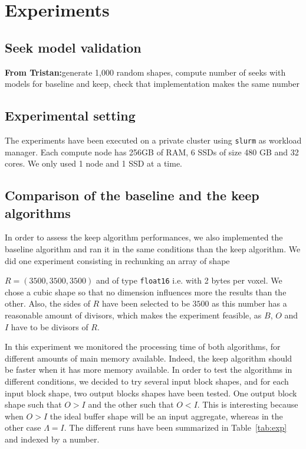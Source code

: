 \documentclass[sigconf, nonacm]{acmart}
\newcommand{\tristan}[1]{\color{orange}\textbf{From Tristan:}#1\color{black}}
\begin{document}
\section{Experiments}
\label{sec:experiments}
\subsection{Seek model validation}

\tristan{generate 1,000 random shapes, compute number of seeks with models for baseline and keep, 
check that implementation makes the same number}

\subsection{Experimental setting}
The experiments have been executed on a private
cluster using \texttt{slurm} as workload manager. Each compute node has 256GB of
RAM, 6 SSDs of size 480 GB and 32 cores. We only used 1 node and 1 SSD at a
time.

\subsection{Comparison of the baseline and the keep algorithms}
In order to assess the keep algorithm performances, we also implemented the
baseline algorithm and ran it in the same conditions than the keep algorithm.
We did one experiment consisting in rechunking an array of shape

$R=(3500,3500,3500)$ and of type \texttt{float16} i.e. with 2 bytes per voxel.
We chose a cubic shape so that no dimension influences more the results than
the other.
Also, the sides of $R$ have been selected to be $3500$ as this number has a
reasonable amount of divisors, which makes the experiment feasible, as
$B$, $O$ and $I$ have to be divisors of $R$.

In this experiment we monitored the processing time of both algorithms, for
different amounts of main memory available.
Indeed, the keep algorithm should be faster when it has more memory available.
In order to test the algorithms in different conditions, we decided to try
several input block shapes, and for each input block shape, two output blocks
shapes have been tested. One output block shape such that $O>I$ and the other
such that $O<I$. This is interesting because when $O>I$ the ideal buffer shape
will be an input aggregate, whereas in the other case $\Lambda=I$.
The different runs have been summarized in Table~\ref{tab:exp} and indexed by
a number.
\end{document}
